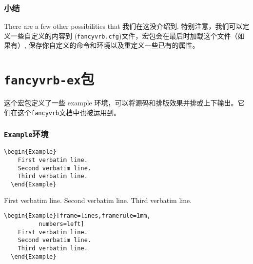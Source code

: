 \documentclass[twoside]{article}
\begin{document}
\begin{changebar}
\iffalse

\section{Thanks}

  For interesting comments and suggestions, we would like to thank specially
(alphabetic order): Philippe \textsc{Esperet}
\url{esperet@marie.polytechnique.fr}, Michael \textsc{Friendly}
\url{friendly@hotspur.psych.yorku.ca}, Rolf \textsc{Niepraschk}
\url{niepraschk@gmx.de} and for bug reports Mario \textsc{Hassler}
\relax\unskip\break
\url{HASSLER@ippnv2.ipp.kfa-juelich.de}, Mikhail \textsc{Kolodin}
\relax\unskip\break
\url{myke@morrigan.spb.su}, Andreas Matthias, Ulrich M. Schwarz, and Vladimir \textsc{Volovich}
\verb+<vvv@vvv.vsu.ru>+.


\fi
\section{小结}

  There are a few other possibilities that 我们在这没介绍到.
  特别注意，我们可以定义一些自定义的内容到
(\texttt{fancyvrb.cfg})文件，宏包会在最后时加载这个文件（如果有）, 
保存你自定义的命令和环境以及重定义一些已有的属性。


\clearpage


\part{\texttt{fancyvrb-ex}包}
这个宏包定义了一些 example 环境，可以将源码和排版效果并排或上下输出。它们在这个\texttt{fancyvrb}文档中也被运用到。

\section{\texttt{Example}环境}

\begin{Verbatim}[gobble=2]
  \begin{Example}
    First verbatim line.
    Second verbatim line.
    Third verbatim line.
  \end{Example}
\end{Verbatim}

\begin{Example}
  First verbatim line.
  Second verbatim line.
  Third verbatim line.
\end{Example}

\begin{Verbatim}[gobble=2]
  \begin{Example}[frame=lines,framerule=1mm,
          numbers=left]
    First verbatim line.
    Second verbatim line.
    Third verbatim line.
  \end{Example}
\end{Verbatim}


\end{changebar}
\end{document}
